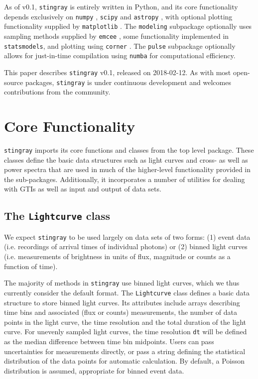 \documentclass[twocolumn]{aastex62}
\newcommand{\stingray}{\texttt{stingray}\xspace}
\newcommand{\lightcurve}{\texttt{Lightcurve}\xspace}
\begin{document}
As of v0.1, \stingray is entirely written in Python, and its core functionality depends exclusively on \texttt{numpy} \citep{numpy}, \texttt{scipy} \citep{scipy} and \texttt{astropy} \citep{astropy}, with optional plotting functionality supplied by \texttt{matplotlib} \citep{matplotlib} . The \texttt{modeling} subpackage optionally uses sampling methods supplied by \texttt{emcee} \citep{emcee}, some functionality implemented in \texttt{statsmodels}, and plotting using \texttt{corner} \citep{corner}. The \texttt{pulse} subpackage optionally allows for just-in-time compilation using \texttt{numba} \citep{numba} for computational efficiency.

This paper describes \stingray v0.1, released on 2018-02-12. 
As with most open-source packages, \stingray is under continuous development and welcomes contributions from the community.


\section{Core Functionality}
\label{sec:core}

\stingray imports its core functions and classes from the top level package. 
These classes define the basic data structures such as light curves and cross- as well as power spectra that are used in much of the higher-level functionality provided in the sub-packages. 
Additionally, it incorporates a number of utilities for dealing with GTIs as well as input and output of data sets. 

\subsection{The \texttt{Lightcurve} class}
\label{sec:lightcurve}

We expect \stingray to be used largely on data sets of two forms: (1) event data (i.e. recordings of arrival times of individual photons) or (2) binned light curves (i.e. measurements of brightness in units of flux, magnitude or counts as a function of time). 

The majority of methods in \stingray use binned light curves, which we thus currently consider the default format. The \lightcurve class defines a basic data structure to store binned light curves. Its attributes include arrays describing time bins and associated (flux or counts) measurements, the number of data points in the light curve, the time resolution and the total duration of the light curve. For unevenly sampled light curves, the time resolution \texttt{dt} will be defined as the median difference between time bin midpoints. Users can pass uncertainties for measurements directly, or pass a string defining the statistical distribution of the data points for automatic calculation. By default, a Poisson distribution is assumed, appropriate for binned event data. 
\end{document}

